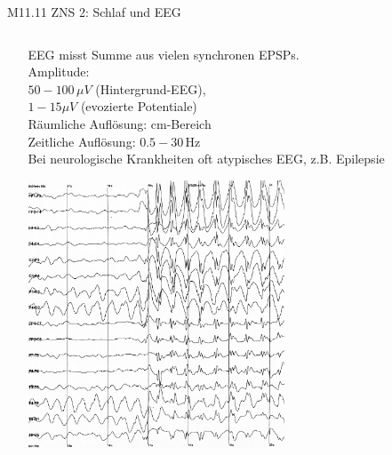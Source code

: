 \documentclass{beamer}
\begin{document}
\begin{frame}{M11.11 ZNS 2: Schlaf und EEG}
\begin{columns}[c]
\begin{column}{5cm}
\begin{center}
\end{center}

\end{column}

\begin{column}{6cm}

EEG misst Summe aus vielen synchronen EPSPs.   \\
Amplitude: \\ \(50-100\,\mu V\) (Hintergrund-EEG), \\ \(1-15\mu V\) (evozierte Potentiale) \\
Räumliche Auflösung: cm-Bereich \\
Zeitliche Auflösung: \(0.5-30\,\)Hz \\ \pause
Bei neurologische Krankheiten oft atypisches EEG, z.B. Epilepsie 


\begin{center}
    \includegraphics[width=0.6\textwidth]{Spike-waves.png}
\end{center}


\end{column}


\end{columns}

\end{frame}
\end{document}
